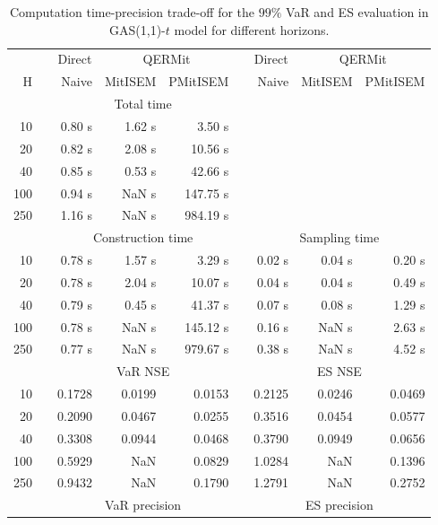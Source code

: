\footnotesize{  
{ \renewcommand{\arraystretch}{1.3} 
\begin{longtable}{rr rrr r rrr}  
\caption{Computation time-precision trade-off for the  $99\%$ VaR and ES evaluation in GAS(1,1)-$t$ model for different horizons.} 
\label{tab:time_precision_t_gas_ML} \\ 
 & & \multicolumn{1}{c}{Direct} & \multicolumn{2}{c}{QERMit}&  & \multicolumn{1}{c}{Direct} & \multicolumn{2}{c}{QERMit} \\ \cline{3-5} \cline{7-9} 
 H & & Naive & MitISEM & PMitISEM & & Naive & MitISEM & PMitISEM \\ \hline 
 & & \multicolumn{3}{c}{Total time}  \\ \cline{3-5} 
10 & & 0.80 s & 1.62 s & 3.50 s  \\ 
20 & & 0.82 s & 2.08 s & 10.56 s  \\ 
40 & & 0.85 s & 0.53 s & 42.66 s  \\ 
100 & & 0.94 s &  NaN s & 147.75 s  \\ 
250 & & 1.16 s &  NaN s & 984.19 s  \\ 
\hline 
 & & \multicolumn{3}{c}{Construction time} & & \multicolumn{3}{c}{ Sampling time} \\ \cline{3-5}  \cline{7-9}
10 & & 0.78 s & 1.57 s & 3.29 s &&  0.02 s & 0.04 s & 0.20 s \\ 
20 & & 0.78 s & 2.04 s & 10.07 s &&  0.04 s & 0.04 s & 0.49 s \\ 
40 & & 0.79 s & 0.45 s & 41.37 s &&  0.07 s & 0.08 s & 1.29 s \\ 
100 & & 0.78 s &  NaN s & 145.12 s &&  0.16 s &  NaN s & 2.63 s \\ 
250 & & 0.77 s &  NaN s & 979.67 s &&  0.38 s &  NaN s & 4.52 s \\ 
\hline 
 & & \multicolumn{3}{c}{VaR NSE} &&  \multicolumn{3}{c}{ES NSE} \\ \cline{3-5}  \cline{7-9}
10 && 0.1728  & 0.0199  & 0.0153 && 0.2125  & 0.0246  & 0.0469  \\ 
20 && 0.2090  & 0.0467  & 0.0255 && 0.3516  & 0.0454  & 0.0577  \\ 
40 && 0.3308  & 0.0944  & 0.0468 && 0.3790  & 0.0949  & 0.0656  \\ 
100 && 0.5929  &    NaN  & 0.0829 && 1.0284  &    NaN  & 0.1396  \\ 
250 && 0.9432  &    NaN  & 0.1790 && 1.2791  &    NaN  & 0.2752  \\ 
\hline 
 & & \multicolumn{3}{c}{VaR precision} &&  \multicolumn{3}{c}{ES precision} \\ \cline{3-5}  \cline{7-9}

\end{longtable}}}

